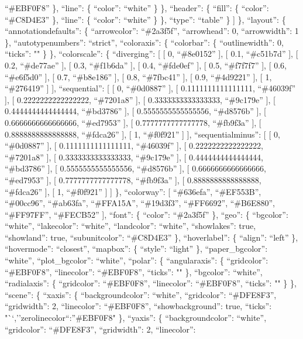 \documentclass[
]{article}
\begin{document}
``\#EBF0F8'' \}, ``line'': \{ ``color'': ``white'' \} \}, ``header'': \{
``fill'': \{ ``color'': ``\#C8D4E3'' \}, ``line'': \{ ``color'':
``white'' \} \}, ``type'': ``table'' \} {]} \}, ``layout'': \{
``annotationdefaults'': \{ ``arrowcolor'': ``\#2a3f5f'', ``arrowhead'':
0, ``arrowwidth'': 1 \}, ``autotypenumbers'': ``strict'', ``coloraxis'':
\{ ``colorbar'': \{ ``outlinewidth'': 0, ``ticks'': "" \} \},
``colorscale'': \{ ``diverging'': {[} {[} 0, ``\#8e0152'' {]}, {[} 0.1,
``\#c51b7d'' {]}, {[} 0.2, ``\#de77ae'' {]}, {[} 0.3, ``\#f1b6da'' {]},
{[} 0.4, ``\#fde0ef'' {]}, {[} 0.5, ``\#f7f7f7'' {]}, {[} 0.6,
``\#e6f5d0'' {]}, {[} 0.7, ``\#b8e186'' {]}, {[} 0.8, ``\#7fbc41'' {]},
{[} 0.9, ``\#4d9221'' {]}, {[} 1, ``\#276419'' {]} {]}, ``sequential'':
{[} {[} 0, ``\#0d0887'' {]}, {[} 0.1111111111111111, ``\#46039f'' {]},
{[} 0.2222222222222222, ``\#7201a8'' {]}, {[} 0.3333333333333333,
``\#9c179e'' {]}, {[} 0.4444444444444444, ``\#bd3786'' {]}, {[}
0.5555555555555556, ``\#d8576b'' {]}, {[} 0.6666666666666666,
``\#ed7953'' {]}, {[} 0.7777777777777778, ``\#fb9f3a'' {]}, {[}
0.8888888888888888, ``\#fdca26'' {]}, {[} 1, ``\#f0f921'' {]} {]},
``sequentialminus'': {[} {[} 0, ``\#0d0887'' {]}, {[}
0.1111111111111111, ``\#46039f'' {]}, {[} 0.2222222222222222,
``\#7201a8'' {]}, {[} 0.3333333333333333, ``\#9c179e'' {]}, {[}
0.4444444444444444, ``\#bd3786'' {]}, {[} 0.5555555555555556,
``\#d8576b'' {]}, {[} 0.6666666666666666, ``\#ed7953'' {]}, {[}
0.7777777777777778, ``\#fb9f3a'' {]}, {[} 0.8888888888888888,
``\#fdca26'' {]}, {[} 1, ``\#f0f921'' {]} {]} \}, ``colorway'': {[}
``\#636efa'', ``\#EF553B'', ``\#00cc96'', ``\#ab63fa'', ``\#FFA15A'',
``\#19d3f3'', ``\#FF6692'', ``\#B6E880'', ``\#FF97FF'', ``\#FECB52''
{]}, ``font'': \{ ``color'': ``\#2a3f5f'' \}, ``geo'': \{ ``bgcolor'':
``white'', ``lakecolor'': ``white'', ``landcolor'': ``white'',
``showlakes'': true, ``showland'': true, ``subunitcolor'': ``\#C8D4E3''
\}, ``hoverlabel'': \{ ``align'': ``left'' \}, ``hovermode'':
``closest'', ``mapbox'': \{ ``style'': ``light'' \}, ``paper\_bgcolor'':
``white'', ``plot\_bgcolor'': ``white'', ``polar'': \{ ``angularaxis'':
\{ ``gridcolor'': ``\#EBF0F8'', ``linecolor'': ``\#EBF0F8'', ``ticks'':
"" \}, ``bgcolor'': ``white'', ``radialaxis'': \{ ``gridcolor'':
``\#EBF0F8'', ``linecolor'': ``\#EBF0F8'', ``ticks'': "" \} \},
``scene'': \{ ``xaxis'': \{ ``backgroundcolor'': ``white'',
``gridcolor'': ``\#DFE8F3'', ``gridwidth'': 2, ``linecolor'':
``\#EBF0F8'', ``showbackground'': true, ``ticks'':
"``,''zerolinecolor``:''\#EBF0F8" \}, ``yaxis'': \{ ``backgroundcolor'':
``white'', ``gridcolor'': ``\#DFE8F3'', ``gridwidth'': 2, ``linecolor'':
\end{document}
